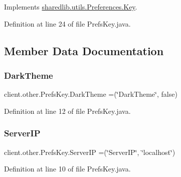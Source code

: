 Implements \hyperlink{interfacesharedlib_1_1utils_1_1_preferences_1_1_key_a966e1acb44cc01f82c1b0d80c83d185d}{sharedlib.\+utils.\+Preferences.\+Key}.



Definition at line 24 of file Prefs\+Key.\+java.



\subsection{Member Data Documentation}
\hypertarget{enumclient_1_1other_1_1_prefs_key_a1712884dcd2b70030aa4e9baadfc5d65}{}\label{enumclient_1_1other_1_1_prefs_key_a1712884dcd2b70030aa4e9baadfc5d65} 
\subsubsection{\texorpdfstring{Dark\+Theme}{DarkTheme}}
{\footnotesize\ttfamily client.\+other.\+Prefs\+Key.\+Dark\+Theme =(\char`\"{}Dark\+Theme\char`\"{}, false)}



Definition at line 12 of file Prefs\+Key.\+java.

\hypertarget{enumclient_1_1other_1_1_prefs_key_afb3297cc8cba1e49ec031c14e115feb8}{}\label{enumclient_1_1other_1_1_prefs_key_afb3297cc8cba1e49ec031c14e115feb8} 
\subsubsection{\texorpdfstring{Server\+IP}{ServerIP}}
{\footnotesize\ttfamily client.\+other.\+Prefs\+Key.\+Server\+IP =(\char`\"{}Server\+IP\char`\"{}, \char`\"{}localhost\char`\"{})}



Definition at line 10 of file Prefs\+Key.\+java.

\hypertarget{enumclient_1_1other_1_1_prefs_key_a967610c3389ceac5034551d3f69c564c}{}\label{enumclient_1_1other_1_1_prefs_key_a967610c3389ceac5034551d3f69c564c} 
